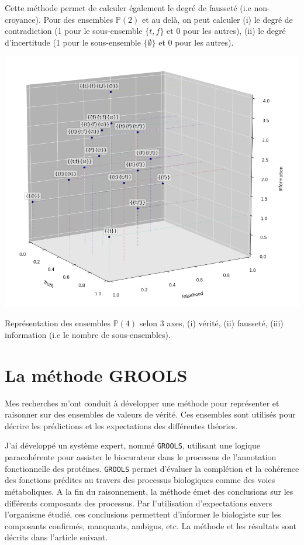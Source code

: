 \begin{refsegment}
Cette méthode permet de calculer également le degré de fausseté (i.e non-croyance). Pour des ensembles  $\mathbb{P}(2)$ et au delà, on peut calculer (i) le degré de contradiction (1 pour le sous-ensemble $\{t,f\}$ et 0 pour les autres), (ii) le degré d'incertitude (1 pour le sous-ensemble $\{\emptyset\}$ et 0 pour les autres).

\begin{shadedfigure}[H]
    \centering
    \includegraphics[width=\textwidth]{img/set_3d.png}
    \caption{Représentation des ensembles  $\mathbb{P}(4)$ selon 3 axes, (i) vérité, (ii) fausseté, (iii) information (i.e le nombre de sous-ensembles).}
    \label{fig:set3d}
\end{shadedfigure}

\section{La méthode GROOLS}\label{sec:methode}

Mes recherches m'ont conduit à développer une méthode pour représenter et raisonner sur des ensembles de valeurs de vérité. Ces ensembles sont utilisés pour décrire les prédictions et les expectations des différentes théories.

J'ai développé un système expert, nommé \texttt{\gls{GROOLS}}, utilisant une logique paracohérente pour assister le biocurateur dans le processus de l'annotation fonctionnelle des protéines. \texttt{\gls{GROOLS}} permet d'évaluer la complétion et la cohérence des fonctions prédites au travers des processus biologiques comme des voies métaboliques. A la fin du raisonnement, la méthode émet des conclusions sur les différents composants des processus. Par l'utilisation d'expectations envers l'organisme étudié, ces conclusions permettent d'informer le biologiste sur les composants confirmés, manquants, ambigus, etc. La méthode et les résultats sont décrits dans l'article suivant.


\end{refsegment}
